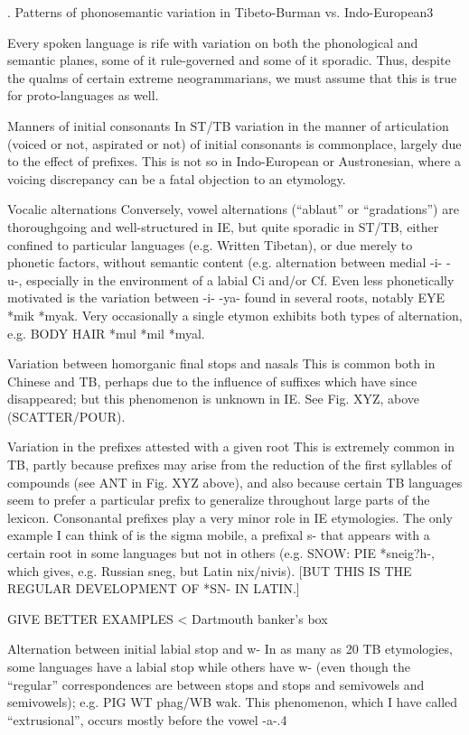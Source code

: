 . Patterns of phonosemantic variation in Tibeto-Burman vs. Indo-European3

Every spoken language is rife with variation on both the phonological and semantic planes, some of it rule-governed and some of it sporadic. Thus, despite the qualms of certain extreme neogrammarians, we must assume that this is true for proto-languages as well. 

Manners of initial consonants
In ST/TB variation in the manner of articulation (voiced or not, aspirated or not) of initial consonants is commonplace, largely due to the effect of prefixes. This is not so in Indo-European or Austronesian, where a voicing discrepancy can be a fatal objection to an etymology.

Vocalic alternations
Conversely, vowel alternations (“ablaut” or “gradations”) are thoroughgoing and well-structured in IE, but quite sporadic in ST/TB, either confined to particular languages (e.g. Written Tibetan), or due merely to phonetic factors, without semantic content (e.g. alternation between medial -i-  -u-, especially in the environment of a labial Ci and/or Cf.  Even less phonetically motivated is the variation between -i-  -ya- found in several roots, notably EYE *mik   *myak.  Very occasionally a single etymon exhibits both types of alternation, e.g. BODY HAIR *mul  *mil    *myal.

Variation between homorganic final stops and nasals
This is common both in Chinese and TB, perhaps due to the influence of suffixes which have since disappeared; but this phenomenon is unknown in IE.  See Fig. XYZ, above (SCATTER/POUR).

Variation in the prefixes attested with a given root
This is extremely common in TB, partly because prefixes may arise from the reduction of the first syllables of compounds (see ANT in Fig. XYZ above), and also because certain TB languages seem to prefer a particular prefix to generalize throughout large parts of the lexicon.  Consonantal prefixes play a very minor role in IE etymologies. The only example I can think of is the sigma mobile, a prefixal s- that appears with a certain root in some languages but not in others (e.g. SNOW: PIE *sneig?h-, which gives, e.g. Russian sneg, but Latin nix/nivis). [BUT THIS IS THE REGULAR DEVELOPMENT OF *SN- IN LATIN.]

	GIVE BETTER EXAMPLES  < Dartmouth banker’s box


Alternation between initial labial stop and w-
In as many as 20 TB etymologies, some languages have a labial stop while others have w- (even though the “regular” correspondences are between  stops and stops and semivowels and semivowels); e.g. PIG WT phag/WB wak.  This phenomenon, which I have called “extrusional”, occurs mostly before the vowel -a-.4

